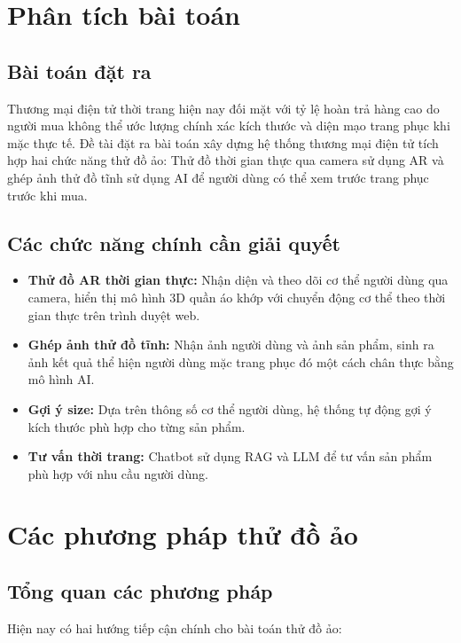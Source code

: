 \section{Phân tích bài toán}

\subsection{Bài toán đặt ra}
Thương mại điện tử thời trang hiện nay đối mặt với tỷ lệ hoàn trả hàng cao do người mua không thể ước lượng chính xác kích thước và diện mạo trang phục khi mặc thực tế. Đề tài đặt ra bài toán xây dựng hệ thống thương mại điện tử tích hợp hai chức năng thử đồ ảo: Thử đồ thời gian thực qua camera sử dụng AR và ghép ảnh thử đồ tĩnh sử dụng AI để người dùng có thể xem trước trang phục trước khi mua.

\subsection{Các chức năng chính cần giải quyết}
\begin{itemize}
    \item \textbf{Thử đồ AR thời gian thực:} Nhận diện và theo dõi cơ thể người dùng qua camera, hiển thị mô hình 3D quần áo khớp với chuyển động cơ thể theo thời gian thực trên trình duyệt web.
    \item \textbf{Ghép ảnh thử đồ tĩnh:} Nhận ảnh người dùng và ảnh sản phẩm, sinh ra ảnh kết quả thể hiện người dùng mặc trang phục đó một cách chân thực bằng mô hình AI.
    \item \textbf{Gợi ý size:} Dựa trên thông số cơ thể người dùng, hệ thống tự động gợi ý kích thước phù hợp cho từng sản phẩm.
    \item \textbf{Tư vấn thời trang:} Chatbot sử dụng RAG và LLM để tư vấn sản phẩm phù hợp với nhu cầu người dùng.
\end{itemize}

\section{Các phương pháp thử đồ ảo}

\subsection{Tổng quan các phương pháp}
Hiện nay có hai hướng tiếp cận chính cho bài toán thử đồ ảo:

